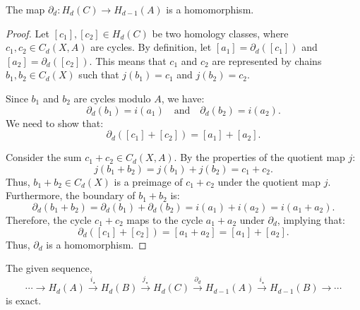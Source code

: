 \begin{proposition}
	The map $\partial_{d}: H_{d}(C) \rightarrow H_{d-1}(A)$ is a homomorphism.
\end{proposition}

\begin{proof}
	Let $[c_{1}], [c_{2}] \in H_{d}(C)$ be two homology classes, where
	$c_{1}, c_{2} \in C_{d}(X,A)$ are cycles. By definition, let
	$[a_{1}] = \partial_{d}([c_{1}])$ and $[a_{2}] = \partial_{d}([c_{2}])$. This means
	that $c_{1}$ and $c_{2}$ are represented by chains $b_{1}, b_{2} \in C_{d}(X)$
	such that $j(b_{1}) = c_{1}$ and $j(b_{2}) = c_{2}$.

	Since $b_{1}$ and $b_{2}$ are cycles modulo $A$, we have:
	\[
		\partial_{d}(b_{1}) = i(a_{1}) \quad \text{and}\quad \partial_{d}(b_{2}) = i(
		a_{2}).
	\]
	We need to show that:
	\[
		\partial_{d}([c_{1}] + [c_{2}]) = [a_{1}] + [a_{2}].
	\]

	Consider the sum $c_{1} + c_{2} \in C_{d}(X,A)$. By the properties of the
	quotient map $j$:
	\[
		j(b_{1} + b_{2}) = j(b_{1}) + j(b_{2}) = c_{1} + c_{2}.
	\]
	Thus, $b_{1} + b_{2} \in C_{d}(X)$ is a preimage of $c_{1} + c_{2}$ under the
	quotient map $j$. Furthermore, the boundary of $b_{1} + b_{2}$ is:
	\[
		\partial_{d}(b_{1} + b_{2}) = \partial_{d}(b_{1}) + \partial_{d}(b_{2}) = i(a
		_{1}) + i(a_{2}) = i(a_{1} + a_{2}).
	\]
	Therefore, the cycle $c_{1} + c_{2}$ maps to the cycle $a_{1} + a_{2}$ under
	$\partial_{d}$, implying that:
	\[
		\partial_{d}([c_{1}] + [c_{2}]) = [a_{1} + a_{2}] = [a_{1}] + [a_{2}].
	\]
	Thus, $\partial_{d}$ is a homomorphism.
\end{proof}

\begin{lemma}
	\label{exacthomsequence} The given sequence,
	\begin{equation}
		\cdots \rightarrow H_{d}(A) \xrightarrow{i_\star}H_{d}(B) \xrightarrow{j_\star}
		H_{d}(C) \xrightarrow{\partial_d}H_{d-1}(A) \xrightarrow{i_\star}H_{d-1}(B) \rightarrow
		\cdots
	\end{equation}
	is exact.
\end{lemma}

